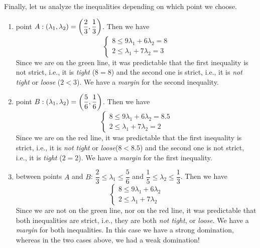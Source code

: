 Finally, let us analyze the inequalities depending on which point we choose. 
\begin{enumerate}
    \item point $A: \left( \lambda_{1},\lambda_{2} \right) = \left( \dfrac{2}{3},\dfrac{1}{3} \right)$.
    Then we have
    \begin{equation*}
    \begin{cases}
    8 \leq 9 \lambda_{1} + 6 \lambda_{2} = 8  \\
    2 \leq \lambda_{1} + 7 \lambda_{2} = 3
    \end{cases}
    \end{equation*}
    Since we are on the green line, it was predictable that the first inequality is not strict, i.e., it is \textit{tight} ($8 = 8$) and the second one is strict, i.e., it is \textit{not tight} or \textit{loose} ($2 < 3$). We have a \textit{margin} for the second inequality.
    
    \item point $B: \left( \lambda_{1},\lambda_{2} \right) = \left( \dfrac{5}{6},\dfrac{1}{6} \right)$.
    Then we have
    \begin{equation*}
    \begin{cases}
    8 \leq 9 \lambda_{1} + 6 \lambda_{2} = 8.5  \\
    2 \leq \lambda_{1} + 7 \lambda_{2} = 2
    \end{cases}
    \end{equation*}
    Since we are on the red line, it was predictable that the first inequality is strict, i.e., it is \textit{not tight} or \textit{loose}($8 < 8.5$) and the second one is not strict, i.e., it is \textit{tight} ($2 = 2$). We have a \textit{margin} for the first inequality.
    
    \item between points $A$ and $B$: $\dfrac{2}{3} \leq \lambda_{1} \leq \dfrac{5}{6}$ and $\dfrac{1}{5} \leq \lambda_{2} \leq \dfrac{1}{3}$.
    Then we have
    \begin{equation*}
    \begin{cases}
    8 \leq 9 \lambda_{1} + 6 \lambda_{2}  \\
    2 \leq \lambda_{1} + 7 \lambda_{2}
    \end{cases}
    \end{equation*}
    Since we are not on the green line, nor on the red line, it was predictable that both inequalities are strict, i.e., they are both \textit{not tight}, or \textit{loose}. We have a \textit{margin} for both inequalities. In this case we have a strong domination, whereas in the two cases above, we had a weak domination!
    
    
\end{enumerate}
    
    
    
    
    




        
